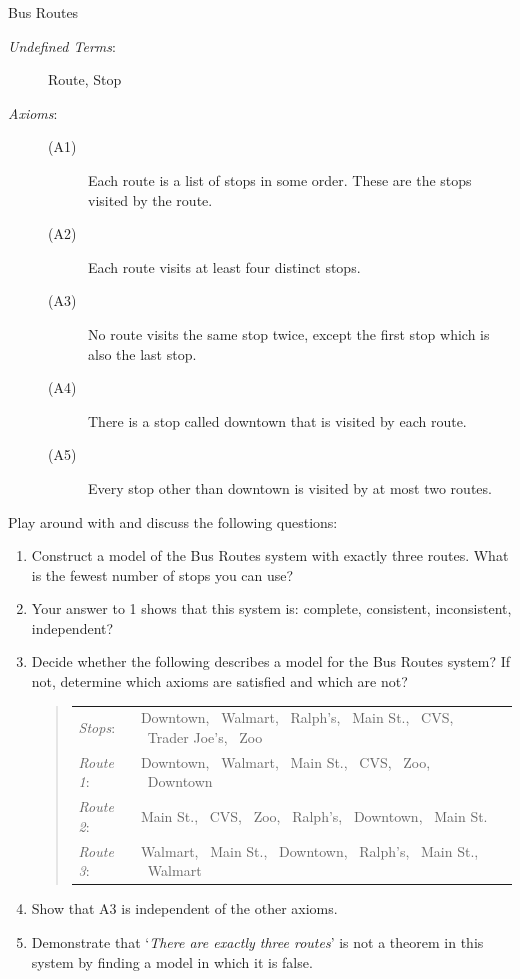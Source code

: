\begin{example}{Bus Routes}{}
	\begin{description}
		\item[\normalfont\emph{Undefined Terms}:] Route, Stop
		\item[\normalfont\emph{Axioms}:]
		\begin{description}
			\item[\normalfont (A1)] Each route is a list of stops in some order. These are the stops visited by the route.
			\item[\normalfont (A2)] Each route visits at least four distinct stops.
			\item[\normalfont (A3)] No route visits the same stop twice, except the first stop which is also the last stop.
			\item[\normalfont (A4)] There is a stop called downtown that is visited by each route.
			\item[\normalfont (A5)] Every stop other than downtown is visited by at most two routes.
		\end{description}
	\end{description}
		
	Play around with and discuss the following questions:
	\begin{enumerate}
	  \item Construct a model of the Bus Routes system with exactly three routes. What is the fewest number of stops you can use?
	  \item Your answer to 1 shows that this system is: complete, consistent, inconsistent, independent?
	  \item Decide whether the following describes a model for the Bus Routes system? If not, determine which axioms are satisfied and which are not?
	  \begin{quote}\def\arraystretch{1.2}
		  \begin{tabular}{@{}ll@{}}
		  	\emph{Stops}:&Downtown, \ Walmart, \ Ralph's, \ Main St., \ CVS, \ Trader Joe's, \ Zoo\\
		  	\emph{Route 1}:&Downtown, \ Walmart, \ Main St., \ CVS, \ Zoo, \ Downtown\\
		  	\emph{Route 2}:&Main St., \ CVS, \ Zoo, \ Ralph's, \ Downtown, \ Main St.\\
		  	\emph{Route 3}:&Walmart, \ Main St., \ Downtown, \ Ralph's, \ Main St., \ Walmart
		  \end{tabular}
	  \end{quote}
		\item Show that A3 is independent of the other axioms.
		\item Demonstrate that `\emph{There are exactly three routes}' is not a theorem in this system by finding a model in which it is false.
	\end{enumerate}
\end{example}


